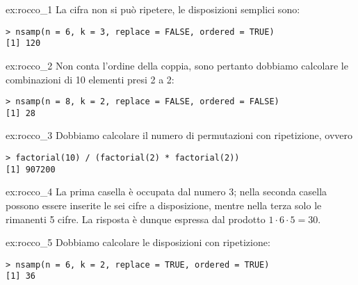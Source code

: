
\begin{sol}{ex:rocco_1}
La cifra non si può ripetere, le disposizioni semplici sono:
\begin{verbatim}
> nsamp(n = 6, k = 3, replace = FALSE, ordered = TRUE)
[1] 120
\end{verbatim}
\end{sol}


\begin{sol}{ex:rocco_2}
Non conta l'ordine della coppia, sono pertanto dobbiamo calcolare le combinazioni di 10 elementi presi 2 a 2:
\begin{verbatim}
> nsamp(n = 8, k = 2, replace = FALSE, ordered = FALSE)
[1] 28
\end{verbatim}
\end{sol}


\begin{sol}{ex:rocco_3}
Dobbiamo calcolare il numero di permutazioni con ripetizione, ovvero
\begin{verbatim}
> factorial(10) / (factorial(2) * factorial(2))
[1] 907200
\end{verbatim}
\end{sol}


\begin{sol}{ex:rocco_4}
La prima casella è occupata dal numero 3; nella seconda casella possono essere inserite le sei cifre a disposizione, mentre nella terza solo le rimanenti 5 cifre. La risposta è dunque espressa dal prodotto $1 \cdot 6\cdot 5 = 30$.
\end{sol}


\begin{sol}{ex:rocco_5}
Dobbiamo calcolare le disposizioni con ripetizione:
\begin{verbatim}
> nsamp(n = 6, k = 2, replace = TRUE, ordered = TRUE)
[1] 36
\end{verbatim}
\end{sol}


